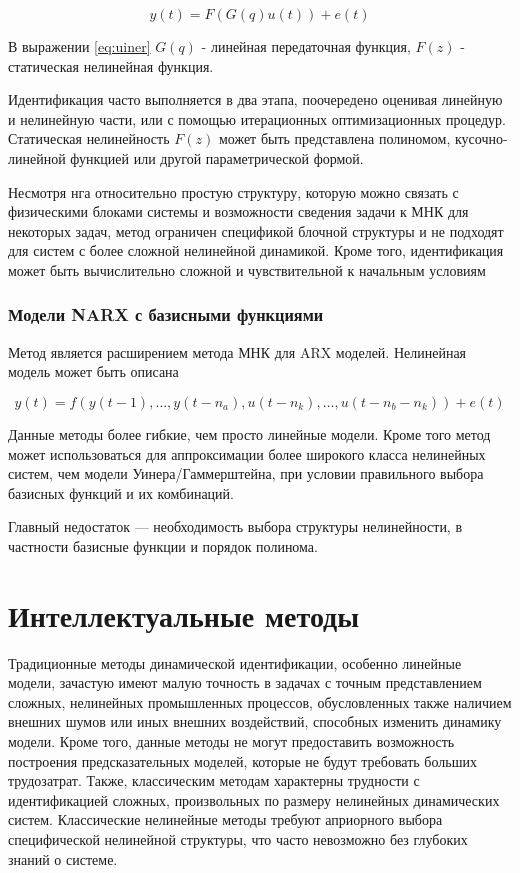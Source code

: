 \begin{equation}
  y(t)=F(G(q)u(t))+e(t)
  \label{eq:uiner}
\end{equation}

В выражении \ref{eq:uiner} $G(q)$ - линейная передаточная функция, $F(z)$ -
статическая нелинейная функция. 

Идентификация часто выполняется в два этапа, поочередено оценивая линейную и
нелинейную части, или с помощью итерационных оптимизационных процедур.
Статическая нелинейность $F(z)$ может быть представлена полиномом, 
кусочно-линейной функцией или другой параметрической формой.

Несмотря нга относительно простую структуру, которую можно связать с
физическими блоками системы и возможности сведения задачи к МНК для некоторых
задач, метод ограничен спецификой блочной структуры и не подходят для систем с
более сложной нелинейной динамикой. Кроме того, идентификация может быть
вычислительно сложной и чувствительной к начальным условиям

\subsubsection{Модели NARX с базисными функциями}

Метод является расширением метода МНК для ARX моделей. Нелинейная модель может быть описана

\begin{equation}
  y(t)=f(y(t-1),\dots,y(t-n_a),u(t-n_k),\dots,u(t-n_b-n_k))+e(t)
  \label{eq:narx}
\end{equation}


Данные методы более гибкие, чем просто линейные модели. Кроме того метод может
использоваться для аппроксимации более широкого класса нелинейных
систем, чем модели Уинера/Гаммерштейна, при условии правильного выбора базисных
функций и их комбинаций. 

Главный недостаток — необходимость выбора структуры нелинейности, в частности
базисные функции и порядок полинома. 

\section{Интеллектуальные методы}

Традиционные методы динамической идентификации, особенно линейные модели,
зачастую имеют малую точность в задачах с точным представлением сложных,
нелинейных промышленных процессов, обусловленных также наличием внешних шумов
или иных внешних воздействий, способных изменить динамику модели. Кроме того, 
данные методы не могут предоставить возможность построения предсказательных 
моделей, которые не будут требовать больших
трудозатрат. Также, классическим методам характерны
трудности с идентификацией сложных, произвольных по
размеру нелинейных динамических систем. Классические
нелинейные методы требуют априорного выбора
специфической нелинейной структуры, что часто
невозможно без глубоких знаний о системе. 

